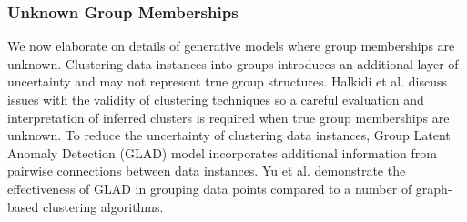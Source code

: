
 
 
 
 









 


\subsubsection{Unknown Group Memberships}
We now elaborate on details of generative models where group memberships are unknown.   Clustering data instances into groups introduces an additional layer of  uncertainty and may not represent true group structures. Halkidi et al. \cite{ClusterValidity} discuss issues with the validity of clustering techniques %
so a careful evaluation and interpretation of inferred clusters is required when true group memberships are unknown. To reduce the uncertainty of clustering data instances, Group Latent Anomaly Detection (GLAD) model \cite{GLAD} incorporates additional information from pairwise connections between data instances. %
  Yu et al. \cite{GLAD} demonstrate the effectiveness of  GLAD in grouping data points compared to a number of graph-based clustering algorithms.

